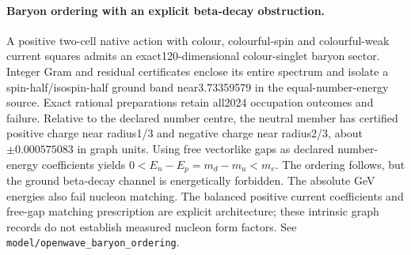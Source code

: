 \paragraph{Baryon ordering with an explicit beta-decay obstruction.}
A positive two-cell native action with colour, colourful-spin and
colourful-weak current squares admits an exact120-dimensional colour-singlet
baryon sector. Integer Gram and residual certificates enclose its entire
spectrum and isolate a spin-half/isospin-half ground band near3.73359579
in the equal-number-energy source. Exact rational preparations retain all2024
occupation outcomes and failure. Relative to the declared number centre,
the neutral member has certified positive charge near radius1/3 and negative
charge near radius2/3, about $\pm0.000575083$ in graph units.
Using free vectorlike gaps as declared number-energy coefficients yields
$0<E_n-E_p=m_d-m_u<m_e$. The ordering follows, but the ground beta-decay
channel is energetically forbidden. The absolute GeV energies also fail
nucleon matching. The balanced positive current coefficients and free-gap
matching prescription are explicit architecture; these intrinsic graph
records do not establish measured nucleon form factors.
See \texttt{model/openwave\_baryon\_ordering}.
